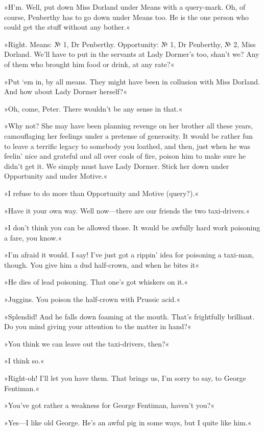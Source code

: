 »H'm. Well, put down Miss Dorland under Means with a query-mark. Oh, of course, Penberthy has to go down under Means too. He is the one person who could get the stuff without any bother.«

»Right. Means: № 1, Dr Penberthy. Opportunity: № 1, Dr Penberthy, № 2, Miss Dorland. We'll have to put in the servants at Lady Dormer's too, shan't we? Any of them who brought him food or drink, at any rate?«

»Put `em in, by all means. They might have been in collusion with Miss Dorland. And how about Lady Dormer herself?«

»Oh, come, Peter. There wouldn't be any sense in that.«

»Why not? She may have been planning revenge on her brother all these years, camouflaging her feelings under a pretense of generosity. It would be rather fun to leave a terrific legacy to somebody you loathed, and then, just when he was feelin' nice and grateful and all over coals of fire, poison him to make sure he didn't get it. We simply must have Lady Dormer. Stick her down under Opportunity and under Motive.«

»I refuse to do more than Opportunity and Motive (query?).«

»Have it your own way. Well now—there are our friends the two taxi-drivers.«

»I don't think you can be allowed those. It would be awfully hard work poisoning a fare, you know.«

»I'm afraid it would. I say! I've just got a rippin' idea for poisoning a taxi-man, though. You give him a dud half-crown, and when he bites it\longdash«

»He dies of lead poisoning. That one's got whiskers on it.«

»Juggins. You poison the half-crown with Prussic acid.«

»Splendid! And he falls down foaming at the mouth. That's frightfully brilliant. Do you mind giving your attention to the matter in hand?«

»You think we can leave out the taxi-drivers, then?«

»I think so.«

»Right-oh! I'll let you have them. That brings us, I'm sorry to say, to George Fentiman.«

»You've got rather a weakness for George Fentiman, haven't you?«

»Yes—I like old George. He's an awful pig in some ways, but I quite like him.«

